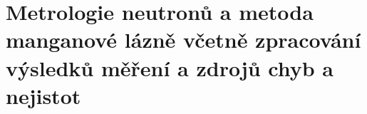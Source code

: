 \section[Metrologie neutronů \& manganová lázeň]{Metrologie neutronů a metoda manganové lázně včetně zpracování výsledků měření a zdrojů chyb a nejistot}

